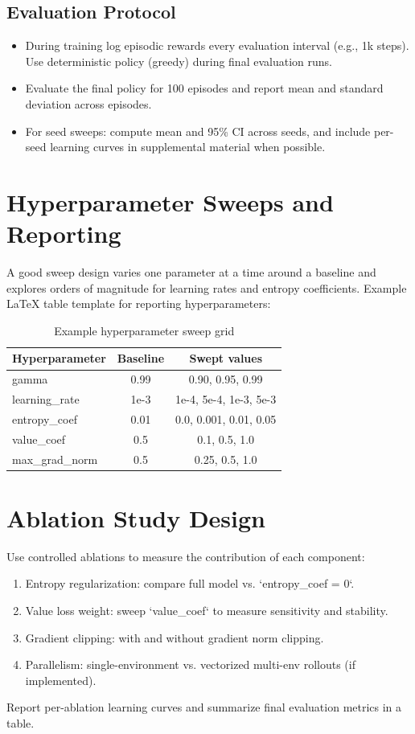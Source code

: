 \documentclass[11pt]{article}
\begin{document}
\subsection{Evaluation Protocol}
\begin{itemize}
  \item During training log episodic rewards every evaluation interval (e.g., 1k steps). Use deterministic policy (greedy) during final evaluation runs.
  \item Evaluate the final policy for 100 episodes and report mean and standard deviation across episodes.
  \item For seed sweeps: compute mean and 95\% CI across seeds, and include per-seed learning curves in supplemental material when possible.
\end{itemize}

\section{Hyperparameter Sweeps and Reporting}
A good sweep design varies one parameter at a time around a baseline and explores orders of magnitude for learning rates and entropy coefficients. Example LaTeX table template for reporting hyperparameters:
\begin{table}[h]
\centering
\begin{tabular}{lcc}
\toprule
Hyperparameter & Baseline & Swept values \\
\midrule
gamma & 0.99 & 0.90, 0.95, 0.99 \\
learning\_rate & 1e-3 & 1e-4, 5e-4, 1e-3, 5e-3 \\
entropy\_coef & 0.01 & 0.0, 0.001, 0.01, 0.05 \\
value\_coef & 0.5 & 0.1, 0.5, 1.0 \\
max\_grad\_norm & 0.5 & 0.25, 0.5, 1.0 \\
\bottomrule
\end{tabular}
\caption{Example hyperparameter sweep grid}
\end{table}

\section{Ablation Study Design}
Use controlled ablations to measure the contribution of each component:
\begin{enumerate}
  \item Entropy regularization: compare full model vs. `entropy_coef = 0`.
  \item Value loss weight: sweep `value_coef` to measure sensitivity and stability.
  \item Gradient clipping: with and without gradient norm clipping.
  \item Parallelism: single-environment vs. vectorized multi-env rollouts (if implemented).
\end{enumerate}
Report per-ablation learning curves and summarize final evaluation metrics in a table.
\end{document}
